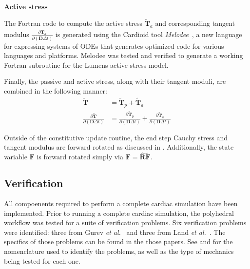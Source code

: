 \textbf{Active stress}

The Fortran code to compute the active stress $\tilde{\bm{T}}_a$ and corresponding tangent modulus $\frac{\partial \tilde{\bm{T}}_a}{\partial (\bm{D}\Delta{t})}$ is generated using the Cardioid tool \textit{Melodee}~\cite{melodee}, a new language for expressing systems of ODEs that generates optimized code for various languages and platforms. Melodee was tested and verified to generate a working Fortran subroutine for the Lumens active stress model.

Finally, the passive and active stress, along with their tangent moduli, are combined in the following manner:
\begin{align}
\tilde{\bm{T}} &= \tilde{\bm{T}}_p + \tilde{\bm{T}}_a \\
\frac{\partial \tilde{\bm{T}}}{\partial (\bm{D}\Delta{t})} &= \frac{\partial \tilde{\bm{T}}_p}{\partial (\bm{D}\Delta{t})}+ \frac{\partial \tilde{\bm{T}}_a}{\partial (\bm{D}\Delta{t})}
\end{align}

Outside of the constitutive update routine, the end step Cauchy stress and tangent modulus are forward rotated as discussed in . Additionally, the state variable $\bm{F}$ is forward rotated simply via $\bm{F} =\hat{\bm{R}}\tilde{\bm{F}}$.


\subsection{Verification}

All compoenents required to perform a complete cardiac simulation have been implemented. Prior to running a complete cardiac simulation, the polyhedral workflow was tested for a suite of verification problems. Six verification problems were identified: three from Gurev \textit{et al.}~\cite{gurev_2015} and three from Land \textit{et al.}~\cite{land_2015}. The specifics of those problems can be found in the those papers. See  and  for the nomenclature used to identify the problems, as well as the type of mechanics being tested for each one.

